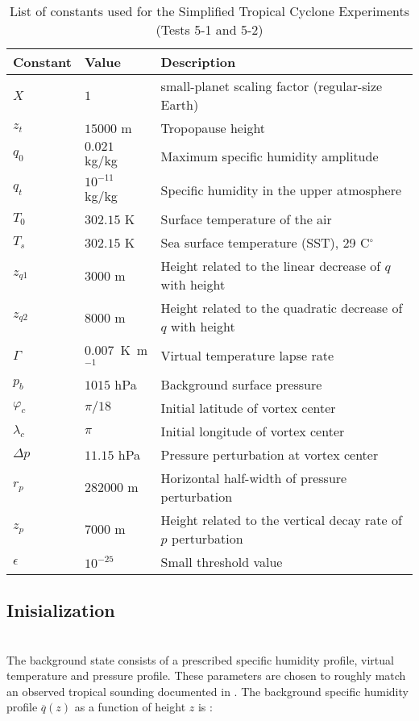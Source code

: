 \documentclass{article}
\begin{document}
\begin{table}[h]

\caption{List of constants used for the Simplified Tropical Cyclone Experiments (Tests 5-1 and 5-2)}

\begin{tabular*}{\textwidth}{@{\extracolsep{\fill}}lll}
\hline Constant & Value & Description \\
\hline
$X$ & $1$ & small-planet scaling factor (regular-size Earth)\\
$z_t$ & $15000$ m & Tropopause height \\
$q_0$ & $0.021$ kg/kg & Maximum specific humidity amplitude \\
$q_t$ & $10^{-11}$ kg/kg & Specific humidity in the upper atmosphere \\
$T_0$ & $302.15$ K & Surface temperature of the air \\
$T_s$ & $302.15$ K & Sea surface temperature (SST), 29 C$^\circ$\\
$z_{q1}$ & $3000$ m & Height related to the linear decrease of $q$ with height \\
$z_{q2}$ & $8000$ m & Height related to the quadratic decrease of $q$ with height \\
$\Gamma$ & $0.007$\ K\ m$^{-1}$ & Virtual temperature lapse rate \\
$p_{b}$ & $1015$ hPa & Background surface pressure \\
$\varphi_c$ & $\pi / 18$ & Initial latitude of vortex center \\
$\lambda_c$ & $\pi$ & Initial longitude of vortex center \\
$\Delta p$ & $11.15$ hPa & Pressure perturbation at vortex center \\
$r_p$ & $282000$ m & Horizontal half-width of pressure perturbation \\
$z_p$ & $7000$ m & Height related to the vertical decay rate of $p$ perturbation \\
$\epsilon$ & $10^{-25}$ & Small threshold value \\
\hline 
\end{tabular*}

\end{table}


\subsection{ Inisialization }


~\\ The background state consists of a prescribed specific humidity profile, virtual temperature and pressure profile.  These parameters are chosen to roughly match an observed tropical sounding documented in \cite{jordan:58}.  The background specific humidity profile $\overline{q}(z)$ as a function of height $z$ is :
\end{document}
